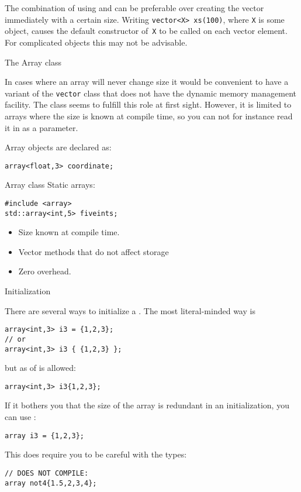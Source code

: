 The combination of using  and 
can be preferable over creating the vector immediately with a certain size.
Writing \lstinline+vector<X> xs(100)+, where \lstinline{X} is some object,
causes the default constructor of~\lstinline{X} to be called on each vector element.
For complicated objects this may not be advisable.

 {The Array class}
\label{sec:cpp-array}
\label{sec:stdarray}

In cases where an array will never change size it would be convenient
to have a variant of the \lstinline{vector} class that does not have
the dynamic memory management facility.
The  class seems to fulfill this role at first sight.
However, it
is limited to arrays where the size is known at compile time,
so you can not for instance read it in as a parameter.


Array objects are declared as:
\begin{lstlisting}
array<float,3> coordinate;
\end{lstlisting}


\begin{slide}{Array class}
\label{sl:array-class}
Static arrays:
\begin{lstlisting}
#include <array>
std::array<int,5> fiveints;
\end{lstlisting}
\begin{itemize}
\item Size known at compile time.
\item Vector methods that do not affect storage
\item Zero overhead.
\end{itemize}
\end{slide}

 {Initialization}

There are several ways to initialize a .
The most literal-minded way is
\begin{lstlisting}
array<int,3> i3 = {1,2,3};
// or
array<int,3> i3 { {1,2,3} };
\end{lstlisting}
but as of   is allowed:
\begin{lstlisting}
array<int,3> i3{1,2,3};  
\end{lstlisting}
If it bothers you that the size of the array is redundant in an initialization,
you can use  :
\begin{lstlisting}
array i3 = {1,2,3};  
\end{lstlisting}
This does require you to be careful with the types:
\begin{lstlisting}
// DOES NOT COMPILE:
array not4{1.5,2,3,4};
\end{lstlisting}

